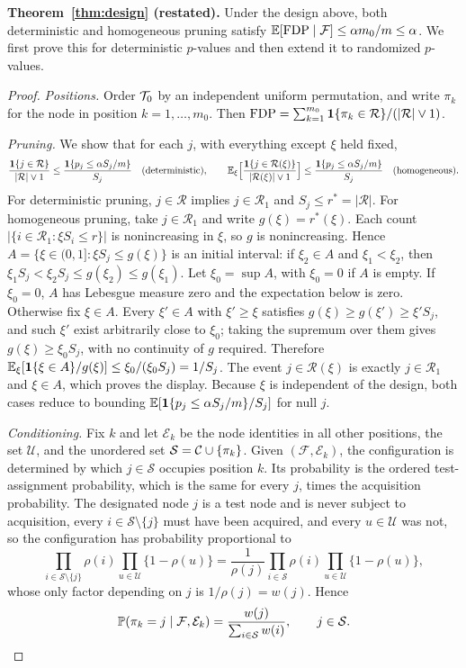 \noindent\textbf{Theorem~\ref{thm:design} (restated).} Under the design above, both deterministic and homogeneous pruning satisfy $\mathbb{E}[\operatorname{FDP}\mid\mathcal F]\le\alpha m_0/m\le\alpha$. We first prove this for deterministic $p$-values and then extend it to randomized $p$-values.

\begin{proof}
\emph{Positions.} Order $\mathcal{T}_0$ by an independent uniform permutation, and write $\pi_k$ for the node in position $k=1,\ldots,m_0$. Then $\operatorname{FDP}=\sum_{k=1}^{m_0}\mathbf{1}\{\pi_k\in\mathcal R\}/(|\mathcal R|\vee1)$.

\emph{Pruning.} We show that for each $j$, with everything except $\xi$ held fixed,
\[
\frac{\mathbf{1}\{j\in\mathcal R\}}{|\mathcal R|\vee1}\le\frac{\mathbf{1}\{p_j\le\alpha S_j/m\}}{S_j}
\quad\text{(deterministic)},\qquad
\mathbb{E}_\xi\Bigl[\frac{\mathbf{1}\{j\in\mathcal R(\xi)\}}{|\mathcal R(\xi)|\vee1}\Bigr]\le\frac{\mathbf{1}\{p_j\le\alpha S_j/m\}}{S_j}
\quad\text{(homogeneous)}.
\]
For deterministic pruning, $j\in\mathcal R$ implies $j\in\mathcal R_1$ and $S_j\le r^*=|\mathcal R|$. For homogeneous pruning, take $j\in\mathcal R_1$ and write $g(\xi)=r^*(\xi)$. Each count $|\{i\in\mathcal R_1:\xi S_i\le r\}|$ is nonincreasing in $\xi$, so $g$ is nonincreasing. Hence $A=\{\xi\in(0,1]:\xi S_j\le g(\xi)\}$ is an initial interval: if $\xi_2\in A$ and $\xi_1<\xi_2$, then $\xi_1S_j<\xi_2S_j\le g(\xi_2)\le g(\xi_1)$. Let $\xi_0=\sup A$, with $\xi_0=0$ if $A$ is empty. If $\xi_0=0$, $A$ has Lebesgue measure zero and the expectation below is zero. Otherwise fix $\xi\in A$. Every $\xi'\in A$ with $\xi'\ge\xi$ satisfies $g(\xi)\ge g(\xi')\ge\xi'S_j$, and such $\xi'$ exist arbitrarily close to $\xi_0$; taking the supremum over them gives $g(\xi)\ge\xi_0S_j$, with no continuity of $g$ required. Therefore $\mathbb{E}_\xi[\mathbf{1}\{\xi\in A\}/g(\xi)]\le\xi_0/(\xi_0S_j)=1/S_j$. The event $j\in\mathcal R(\xi)$ is exactly $j\in\mathcal R_1$ and $\xi\in A$, which proves the display. Because $\xi$ is independent of the design, both cases reduce to bounding $\mathbb{E}[\mathbf{1}\{p_j\le\alpha S_j/m\}/S_j]$ for null $j$.

\emph{Conditioning.} Fix $k$ and let $\mathcal E_k$ be the node identities in all other positions, the set $\mathcal U$, and the unordered set $\mathcal S=\mathcal{C}\cup\{\pi_k\}$. Given $(\mathcal F,\mathcal E_k)$, the configuration is determined by which $j\in\mathcal S$ occupies position $k$. Its probability is the ordered test-assignment probability, which is the same for every $j$, times the acquisition probability. The designated node $j$ is a test node and is never subject to acquisition, every $i\in\mathcal S\setminus\{j\}$ must have been acquired, and every $u\in\mathcal U$ was not, so the configuration has probability proportional to
\[
\prod_{i\in\mathcal S\setminus\{j\}}\rho(i)\prod_{u\in\mathcal U}\{1-\rho(u)\}
=\frac{1}{\rho(j)}\prod_{i\in\mathcal S}\rho(i)\prod_{u\in\mathcal U}\{1-\rho(u)\},
\]
whose only factor depending on $j$ is $1/\rho(j)=w(j)$. Hence
\[
\mathbb{P}(\pi_k=j\mid\mathcal F,\mathcal E_k)=\frac{w(j)}{\sum_{i\in\mathcal S}w(i)},\qquad j\in\mathcal S.
\]


\end{proof}
